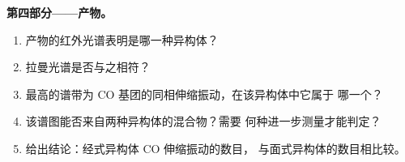 \begin{problem}
\medskip\noindent\textbf{第四部分——产物。}
\begin{enumerate}[resume]
  \item 产物的红外光谱表明是哪一种异构体？
  \item 拉曼光谱是否与之相符？
  \item 最高的谱带为 CO 基团的同相伸缩振动，在该异构体中它属于
        哪一个？
  \item 该谱图能否来自两种异构体的混合物？需要
        何种进一步测量才能判定？
  \item 给出结论：经式异构体 CO 伸缩振动的数目，
        与面式异构体的数目相比较。
\end{enumerate}
\end{problem}
